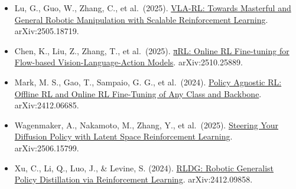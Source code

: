 \vspace{0.25em}
\begin{itemize}
\tightlist
\item
  Lu, G., Guo, W., Zhang, C., et al.~(2025). \href{https://arxiv.org/abs/2505.18719}{VLA-RL: Towards Masterful and General Robotic Manipulation with Scalable Reinforcement Learning}. arXiv:2505.18719.
\item
  Chen, K., Liu, Z., Zhang, T., et al.~(2025). \href{https://arxiv.org/abs/2510.25889}{πRL: Online RL Fine-tuning for Flow-based Vision-Language-Action Models}. arXiv:2510.25889.
\item
  Mark, M. S., Gao, T., Sampaio, G. G., et al.~(2024). \href{https://arxiv.org/abs/2412.06685}{Policy Agnostic RL: Offline RL and Online RL Fine-Tuning of Any Class and Backbone}. arXiv:2412.06685.
\item
  Wagenmaker, A., Nakamoto, M., Zhang, Y., et al.~(2025). \href{https://arxiv.org/abs/2506.15799}{Steering Your Diffusion Policy with Latent Space Reinforcement Learning}. arXiv:2506.15799.
\item
  Xu, C., Li, Q., Luo, J., \& Levine, S. (2024). \href{https://arxiv.org/abs/2412.09858}{RLDG: Robotic Generalist Policy Distillation via Reinforcement Learning}. arXiv:2412.09858.
\end{itemize}

\clearpage
